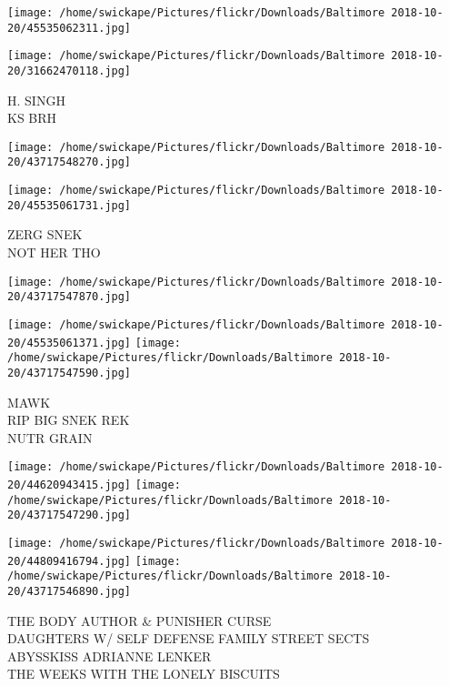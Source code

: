\documentclass[10pt,letterpaper]{article}
\begin{document}
\texttt{[image: /home/swickape/Pictures/flickr/Downloads/Baltimore 2018-10-20/45535062311.jpg]}

\vspace{0.25in}
\texttt{[image: /home/swickape/Pictures/flickr/Downloads/Baltimore 2018-10-20/31662470118.jpg]}

H. SINGH\\
KS BRH\\
\pagebreak

\texttt{[image: /home/swickape/Pictures/flickr/Downloads/Baltimore 2018-10-20/43717548270.jpg]}

\vspace{0.25in}
\texttt{[image: /home/swickape/Pictures/flickr/Downloads/Baltimore 2018-10-20/45535061731.jpg]}

ZERG SNEK\\
NOT HER THO\\
\pagebreak

\texttt{[image: /home/swickape/Pictures/flickr/Downloads/Baltimore 2018-10-20/43717547870.jpg]}

\vspace{0.25in}
\texttt{[image: /home/swickape/Pictures/flickr/Downloads/Baltimore 2018-10-20/45535061371.jpg]}
\texttt{[image: /home/swickape/Pictures/flickr/Downloads/Baltimore 2018-10-20/43717547590.jpg]}

MAWK\\
RIP BIG SNEK REK\\
NUTR GRAIN\\
\pagebreak

\texttt{[image: /home/swickape/Pictures/flickr/Downloads/Baltimore 2018-10-20/44620943415.jpg]}
\texttt{[image: /home/swickape/Pictures/flickr/Downloads/Baltimore 2018-10-20/43717547290.jpg]}

\texttt{[image: /home/swickape/Pictures/flickr/Downloads/Baltimore 2018-10-20/44809416794.jpg]}
\texttt{[image: /home/swickape/Pictures/flickr/Downloads/Baltimore 2018-10-20/43717546890.jpg]}

THE BODY AUTHOR \& PUNISHER CURSE\\
DAUGHTERS W/ SELF DEFENSE FAMILY STREET SECTS\\
ABYSSKISS ADRIANNE LENKER\\
THE WEEKS WITH THE LONELY BISCUITS\\
\pagebreak
\end{document}

